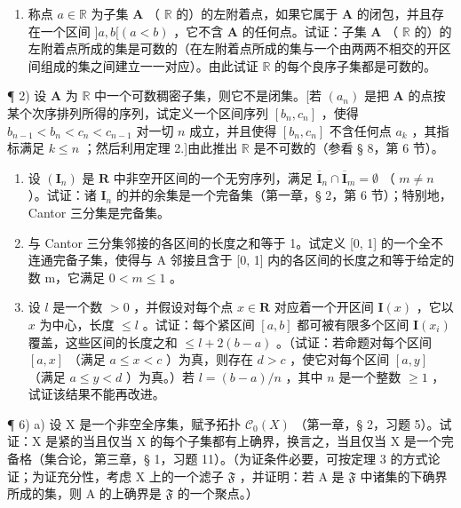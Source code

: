 \BourbakiExerciseGroup

\begin{enumerate}
\def\labelenumi{\arabic{enumi})}
\tightlist
\item
称点 \(a \in \mathbb{R}\) 为子集 \(\mathbf{A}\) （ \(\mathbb{R}\) 的）的左附着点，如果它属于 \(\mathbf{A}\) 的闭包，并且存在一个区间 \(]a, b[ (a < b)\) ，它不含 \(\mathbf{A}\) 的任何点。试证：子集 \(\mathbf{A}\) （ \(\mathbb{R}\) 的）的左附着点所成的集是可数的（在左附着点所成的集与一个由两两不相交的开区间组成的集之间建立一一对应）。由此试证 \(\mathbb{R}\) 的每个良序子集都是可数的。
\end{enumerate}

¶ 2) 设 \(\mathbf{A}\) 为 \(\mathbb{R}\) 中一个可数稠密子集，则它不是闭集。{[}若 \((a_{n})\) 是把 \(\mathbf{A}\) 的点按某个次序排列所得的序列，试定义一个区间序列 \([b_{n}, c_{n}]\) ，使得 \(b_{n-1} < b_{n} < c_{n} < c_{n-1}\) 对一切 \(n\) 成立，并且使得 \([b_{n}, c_{n}]\) 不含任何点 \(a_{k}\) ，其指标满足 \(k \leqslant n\) ；然后利用定理 2.{]}由此推出 \(\mathbb{R}\) 是不可数的（参看 § 8，第 6 节）。

\begin{enumerate}
\def\labelenumi{\arabic{enumi})}
\setcounter{enumi}{2}
\item
设 \((\mathbf{I}_n)\) 是 \(\mathbf{R}\) 中非空开区间的一个无穷序列，满足 \(\overline{\mathbf{I}}_n \cap \overline{\mathbf{I}}_m = \emptyset\) （ \(m \neq n\) ）。试证：诸 \(\mathbf{I}_n\) 的并的余集是一个完备集（第一章，§ 2，第 6 节）；特别地，Cantor 三分集是完备集。
\item
与 Cantor 三分集邻接的各区间的长度之和等于 1。试定义 {[}0, 1{]} 的一个全不连通完备子集，使得与 A 邻接且含于 {[}0, 1{]} 内的各区间的长度之和等于给定的数 m，它满足 \(0 < m \leqslant 1\) 。
\item
设 \(l\) 是一个数 \(> 0\) ，并假设对每个点 \(x \in \mathbf{R}\) 对应着一个开区间 \(\mathbf{I}(x)\) ，它以 \(x\) 为中心，长度 \(\leqslant l\) 。试证：每个紧区间 \([a, b]\) 都可被有限多个区间 \(\mathbf{I}(x_i)\) 覆盖，这些区间的长度之和 \(\leqslant l + 2(b - a)\) 。（试证：若命题对每个区间 \([a, x]\) （满足 \(a \leqslant x < c\) ）为真，则存在 \(d > c\) ，使它对每个区间 \([a, y]\) （满足 \(a \leqslant y < d\) ）为真。）若 \(l = (b - a)/n\) ，其中 \(n\) 是一个整数 \(\geqslant 1\) ，试证该结果不能再改进。
\end{enumerate}

¶ 6) a) 设 X 是一个非空全序集，赋予拓扑 \(\mathcal{C}_{0}(X)\) （第一章，§ 2，习题 5）。试证：X 是紧的当且仅当 X 的每个子集都有上确界，换言之，当且仅当 X 是一个完备格（集合论，第三章，§ 1，习题 11）。（为证条件必要，可按定理 3 的方式论证；为证充分性，考虑 X 上的一个滤子 \(\mathfrak{F}\) ，并证明：若 A 是 \(\mathfrak{F}\) 中诸集的下确界所成的集，则 A 的上确界是 \(\mathfrak{F}\) 的一个聚点。）

